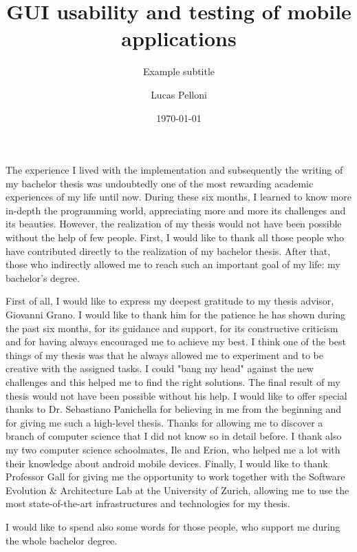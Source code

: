 \documentclass{seal_thesis}
\date{\today}
\title{GUI usability and testing of mobile applications}
\subtitle{Example subtitle}
\author{Lucas Pelloni}
\begin{document}
\maketitle



\frontmatter




\begin{acknowledgements}
The experience I lived with the implementation and subsequently the writing of my bachelor thesis was undoubtedly one of the most rewarding academic experiences of my life until now. During these six months, I learned to know more in-depth the programming world, appreciating more and more its challenges and its beauties.
However, the realization of my thesis would not have been possible without the help of few people. First, I would like to thank all those people who have contributed directly to the realization of my bachelor thesis. After that, those who indirectly allowed me to reach such an important goal of my life: my bachelor's degree.

First of all, I would like to express my deepest gratitude to my thesis advisor, Giovanni Grano. I would like to thank him for the patience he has shown during the past six months, for its guidance and support, for its constructive criticism and for having always encouraged me to achieve my best. I think one of the best things of my thesis was that he always allowed me to experiment and to be creative with the assigned tasks. I could  "bang my head" against the new challenges and this helped me to find the right solutions.
The final result of my thesis would not have been possible without his help. 
I would like to offer special thanks to Dr. Sebastiano Panichella for believing in me from the beginning and for giving me such a high-level thesis. Thanks for allowing me to discover a branch of computer science that I did not know so in detail before. 
I thank also my two computer science schoolmates, Ile and Erion, who helped me a lot with their knowledge about android mobile devices.
Finally, I would like to thank Professor Gall for giving me the opportunity to work together with the Software Evolution \& Architecture Lab at the University of Zurich, allowing me to use the most state-of-the-art infrastructures and technologies for my thesis. 

I would like to spend also some words for those people, who support me during the whole bachelor degree. 
\end{acknowledgements}
\end{document}
